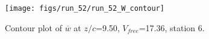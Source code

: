 \begin{figure}[H]
\centering
\texttt{[image: figs/run\_52/run\_52\_W\_contour]}
\caption{Contour plot of $\overline{w}$ at $z/c$=9.50, $V_{free}$=17.36, station 6.}
\label{fig:run_52_W_contour}
\end{figure}


